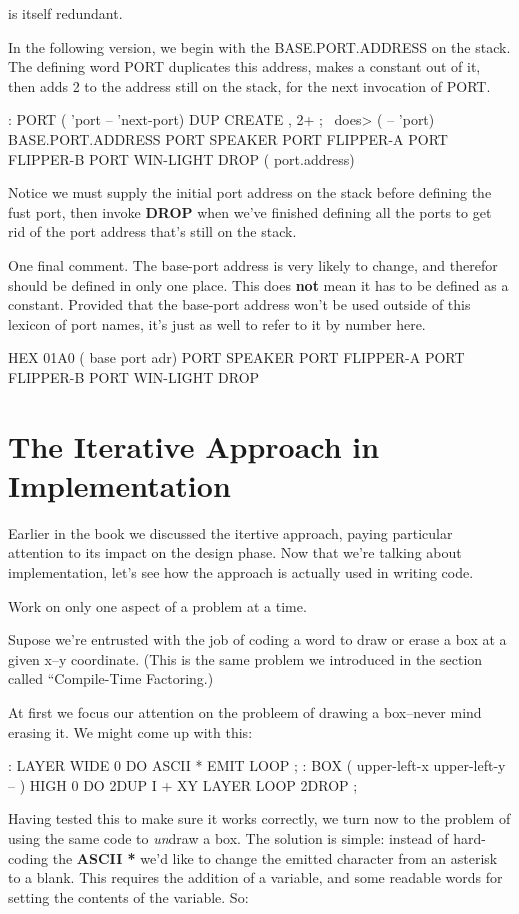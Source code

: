 \medskip

\noindent
is itself redundant.

In the following version, we begin with the BASE.PORT.ADDRESS on the stack. The defining word PORT duplicates this address, makes a constant out of it, then adds 2 to the address still on the stack, for the next invocation of PORT.

\begin{Code}
: PORT   ( 'port -- 'next-port)  DUP CREATE ,  2+ ;
   \ does>  ( -- 'port)
BASE.PORT.ADDRESS
  PORT SPEAKER
  PORT FLIPPER-A
  PORT FLIPPER-B
  PORT WIN-LIGHT
DROP ( port.address)
\end{Code}
Notice we must supply the initial port address on the stack before defining the fust port, then invoke \textbf{DROP} when we've finished defining all the ports to get rid of the port address that's still on the stack.

One final comment. The base-port address is very likely to change, and therefor should be defined in only one place. This does \textbf{not} mean it has to be defined as a constant. Provided that the base-port address won't be used outside of this lexicon of port names, it's just as well to refer to it by number here.

\begin{Code}
HEX 01A0  ( base port adr)
  PORT SPEAKER
  PORT FLIPPER-A
  PORT FLIPPER-B
  PORT WIN-LIGHT
DROP
\end{Code}

\section{{{{The Iterative Approach in Implementation}}}}
Earlier in the book we discussed the itertive approach, paying particular attention to its impact on the design phase. Now that we're talking about implementation, let's see how the approach is actually used in writing code.

\begin{tip}
Work on only one aspect of a problem at a time.
\end{tip}
Supose we're entrusted with the job of coding a word to draw or erase a box at a given x--y coordinate. (This is the same problem we introduced in the section called ``Compile-Time Factoring.)

At first we focus our attention on the probleem of drawing a box--never mind erasing it. We might come up with this:

\begin{Code}
: LAYER   WIDE  0 DO  ASCII * EMIT  LOOP ;
: BOX   ( upper-left-x  upper-left-y -- )
   HIGH  0 DO  2DUP  I +  XY LAYER  LOOP  2DROP ;
\end{Code}
Having tested this to make sure it works correctly, we turn now to the problem of using the same code to \emph{un}draw a box. The solution is simple: instead of hard-coding the \textbf{ASCII *} we'd like to change the emitted character from an asterisk to a blank. This requires the addition of a variable, and some readable words for setting the contents of the variable. So:


